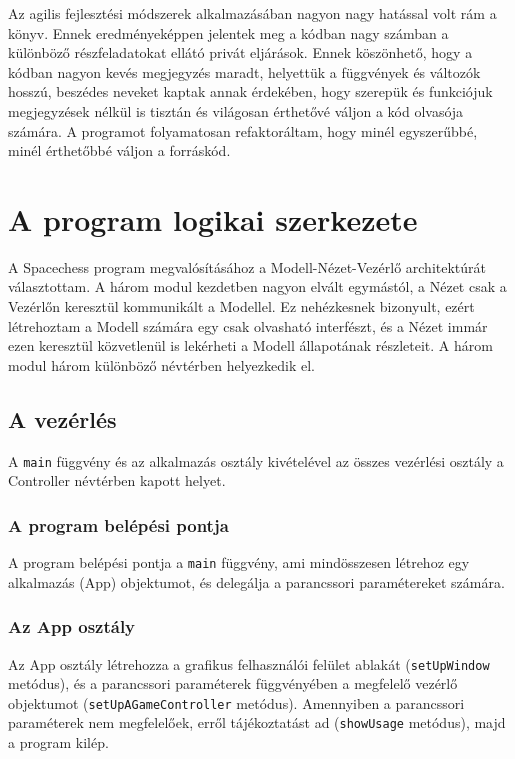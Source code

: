 \documentclass[12pt, twoside]{report}
\begin{document}
Az agilis fejlesztési módszerek alkalmazásában nagyon nagy hatással volt rám a \cite{cleancode} könyv. Ennek eredményeképpen jelentek meg a kódban nagy számban a különböző részfeladatokat ellátó privát eljárások. Ennek köszönhető, hogy a kódban nagyon kevés megjegyzés maradt, helyettük a függvények és változók hosszú, beszédes neveket kaptak annak érdekében, hogy szerepük és funkciójuk megjegyzések nélkül is tisztán és világosan érthetővé váljon a kód olvasója számára. A programot folyamatosan refaktoráltam, hogy minél egyszerűbbé, minél érthetőbbé váljon a forráskód.

\section{A program logikai szerkezete}

A Spacechess program megvalósításához a Modell-Nézet-Vezérlő architektúrát választottam. A három modul kezdetben nagyon elvált egymástól, a Nézet csak a Vezérlőn keresztül kommunikált a Modellel. Ez nehézkesnek bizonyult, ezért létrehoztam a Modell számára egy csak olvasható interfészt, és a Nézet immár ezen keresztül közvetlenül is lekérheti a Modell állapotának részleteit. A három modul három különböző névtérben helyezkedik el.

\subsection{A vezérlés}

A {\tt main} függvény és az alkalmazás osztály kivételével az összes vezérlési osztály a Controller névtérben kapott helyet.

\subsubsection{A program belépési pontja}

A program belépési pontja a {\tt main} függvény, ami mindösszesen létrehoz egy alkalmazás (App) objektumot, és delegálja a parancssori paramétereket számára.

\subsubsection{Az App osztály}

Az App osztály létrehozza a grafikus felhasználói felület ablakát ({\tt setUpWindow} metódus), és a parancssori paraméterek függvényében a megfelelő vezérlő objektumot ({\tt setUpAGameController} metódus). Amennyiben a parancssori paraméterek nem megfelelőek, erről tájékoztatást ad ({\tt showUsage} metódus), majd a program kilép.
\end{document}
